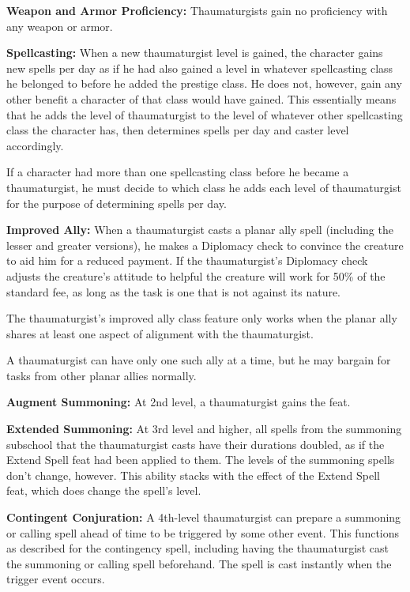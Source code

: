 {
\textbf{Weapon and Armor Proficiency:} Thaumaturgists gain no proficiency with any weapon or armor.

\textbf{Spellcasting:} When a new thaumaturgist level is gained, the character gains new spells per day as if he had also gained a level in whatever spellcasting class he belonged to before he added the prestige class. He does not, however, gain any other benefit a character of that class would have gained. This essentially means that he adds the level of thaumaturgist to the level of whatever other spellcasting class the character has, then determines spells per day and caster level accordingly.

If a character had more than one spellcasting class before he became a thaumaturgist, he must decide to which class he adds each level of thaumaturgist for the purpose of determining spells per day.

\textbf{Improved Ally:} When a thaumaturgist casts a planar ally spell (including the lesser and greater versions), he makes a Diplomacy check to convince the creature to aid him for a reduced payment. If the thaumaturgist's Diplomacy check adjusts the creature's attitude to helpful the creature will work for 50\% of the standard fee, as long as the task is one that is not against its nature.

The thaumaturgist's improved ally class feature only works when the planar ally shares at least one aspect of alignment with the thaumaturgist.

A thaumaturgist can have only one such ally at a time, but he may bargain for tasks from other planar allies normally.

\textbf{Augment Summoning:} At 2nd level, a thaumaturgist gains the  feat.

\textbf{Extended Summoning:} At 3rd level and higher, all spells from the summoning subschool that the thaumaturgist casts have their durations doubled, as if the Extend Spell feat had been applied to them. The levels of the summoning spells don't change, however. This ability stacks with the effect of the Extend Spell feat, which does change the spell's level.

\textbf{Contingent Conjuration:} A 4th-level thaumaturgist can prepare a summoning or calling spell ahead of time to be triggered by some other event. This functions as described for the contingency spell, including having the thaumaturgist cast the summoning or calling spell beforehand. The spell is cast instantly when the trigger event occurs.

}
